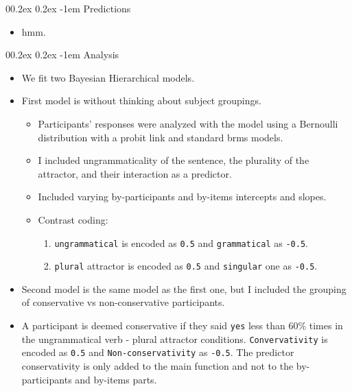\documentclass[
  10pt,
  english,
  doc,floatsintext]{apa6}
\makeatletter
\providecommand{\tightlist}{%
  \setlength{\itemsep}{0pt}\setlength{\parskip}{0pt}}
\let\oldparagraph\paragraph
\renewcommand{\paragraph}[1]{\oldparagraph{#1}\mbox{}}
\renewcommand{\paragraph}{\@startsection{paragraph}{4}{\parindent}%
  {0\baselineskip \@plus 0.2ex \@minus 0.2ex}%
  {-1em}%
  {\normalfont\normalsize\bfseries\itshape\typesectitle}}
\makeatother
\begin{document}
\hypertarget{predictions}{%
\paragraph{Predictions}\label{predictions}}

\begin{itemize}
\tightlist
\item
  hmm.
\end{itemize}

\hypertarget{analysis}{%
\paragraph{Analysis}\label{analysis}}

\begin{itemize}
\item
  We fit two Bayesian Hierarchical models.\\
\item
  First model is without thinking about subject groupings.

  \begin{itemize}
  \item
    Participants' responses were analyzed with the model using a Bernoulli distribution with a probit link and standard brms models.
  \item
    I included ungrammaticality of the sentence, the plurality of the attractor, and their interaction as a predictor.
  \item
    Included varying by-participants and by-items intercepts and slopes.
  \item
    Contrast coding:

    \begin{enumerate}
    \def\labelenumi{\arabic{enumi}.}
    \tightlist
    \item
      \texttt{ungrammatical} is encoded as \texttt{0.5} and \texttt{grammatical} as \texttt{-0.5}.
    \item
      \texttt{plural} attractor is encoded as \texttt{0.5} and \texttt{singular} one as \texttt{-0.5}.
    \end{enumerate}
  \end{itemize}
\item
  Second model is the same model as the first one, but I included the grouping of conservative vs non-conservative participants.
\item
  A participant is deemed conservative if they said \texttt{yes} less than 60\% times in the ungrammatical verb - plural attractor conditions. \texttt{Convervativity} is encoded as \texttt{0.5} and \texttt{Non-conservativity} as \texttt{-0.5}. The predictor conservativity is only added to the main function and not to the by-participants and by-items parts.
\end{itemize}
\end{document}
